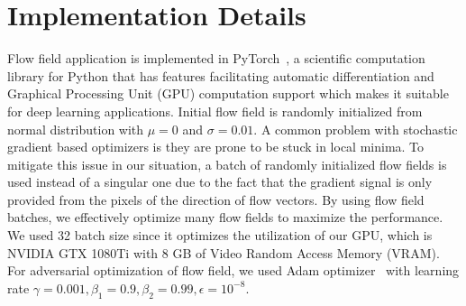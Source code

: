 
\section{Implementation Details}
Flow field application is implemented in PyTorch~\cite{torch}, a scientific computation library for Python that has features facilitating automatic differentiation and Graphical Processing Unit (GPU) computation support which makes it suitable for deep learning applications.
Initial flow field is randomly initialized from normal distribution with \(\mu = 0\) and \(\sigma = 0.01\). A common problem with stochastic gradient based optimizers is they are prone to be stuck in local minima. To mitigate this issue in our situation, a batch of randomly initialized flow fields is used instead of a singular one due to the fact that the gradient signal is only provided from the pixels of the direction of flow vectors. By using flow field batches, we effectively optimize many flow fields to maximize the performance. We used 32 batch size since it optimizes the utilization of our GPU, which is NVIDIA GTX 1080Ti with 8 GB of Video Random Access Memory (VRAM). For adversarial optimization of flow field, we used Adam optimizer~\cite{kingma2015adam} with learning rate \(\gamma = 0.001, \beta_1 = 0.9, \beta_2 = 0.99, \epsilon = 10^{-8}\).

